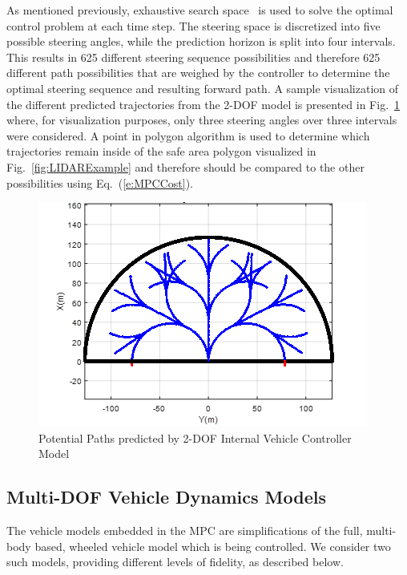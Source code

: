 \documentclass[12pt,onecolumn]{article}
\newcommand{\CHRONO}{{\sffamily{{Chrono}}}}
\begin{document}
As mentioned previously, exhaustive search space~\cite{ModelFidelity2016} is used to solve the optimal control problem at each time step. The steering space is discretized into five possible steering angles, while the prediction horizon is split into four intervals. This results in 625 different steering sequence possibilities and therefore 625 different path possibilities that are weighed by the controller to determine the optimal steering sequence and resulting forward path. A sample visualization of the different predicted trajectories from the 2-DOF model is presented in Fig.~\ref{fig:PossiblePaths} where, for visualization purposes, only three steering angles over three intervals were considered. A point in polygon algorithm is used to determine which trajectories remain inside of the safe area polygon visualized in Fig.~\ref{fig:LIDARExample} and therefore should be compared to the other possibilities using Eq.~(\ref{e:MPCCost}).

\begin{figure}
	\centering
	\includegraphics[width=\columnwidth]{Figs/PathPossibilities.png}
	\caption{\small Potential Paths predicted by 2-DOF Internal Vehicle Controller Model}  
	\label{fig:PossiblePaths}
\end{figure}


\subsection{Multi-DOF Vehicle Dynamics Models}\label{ss:IntModel}

The vehicle models embedded in the MPC are simplifications of the full, multi-body based, {\CHRONO} wheeled vehicle model which is being controlled.  We consider two such models, providing different levels of fidelity, as described below.
\end{document}
